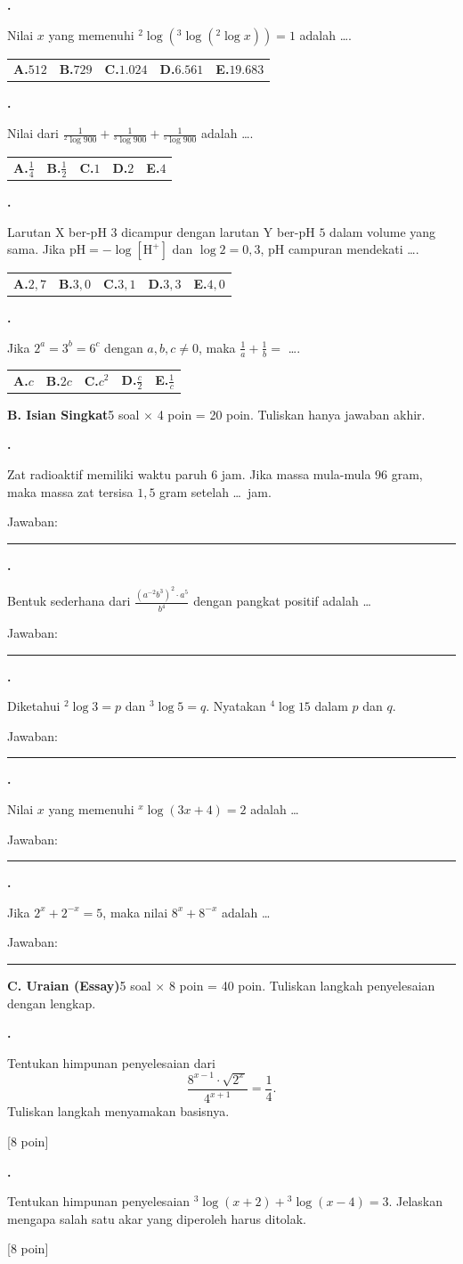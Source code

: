 \documentclass[a4paper,11pt]{article}
\newcommand{\dis}{\displaystyle}
\newcommand{\alog}[2]{{}^{#1}\!\log #2}
\newcounter{no}
\newcommand{\bagian}[2]{\par\Needspace{6\baselineskip}\vspace{1.0em}\noindent
  \begin{tcolorbox}[colback=navy,colframe=navy,coltext=white,boxrule=0pt,arc=2pt,left=6pt,right=6pt,top=3pt,bottom=3pt]
  \textbf{#1}\hfill{\small #2}\end{tcolorbox}\setcounter{no}{0}\par\vspace{-0.3em}}
\newcommand{\soal}[2]{\par\vspace{0.75em}\stepcounter{no}\noindent
  \begin{minipage}[t]{1.8em}\textbf{\theno.}\end{minipage}%
  \begin{minipage}[t]{\dimexpr\linewidth-1.8em\relax}#1\par\vspace{0.35em}#2\end{minipage}\par}
\newcommand{\poin}[1]{\hfill{\small\color{navy}[#1 poin]}}
\begin{document}
\soal{Nilai $x$ yang memenuhi $\alog{2}{\left(\alog{3}{\left(\alog{2}{x}\right)}\right)}=1$ adalah \dots.}{\begin{tabularx}{\linewidth}{@{}*{5}{X}@{}}\textbf{A.}\;$512$ & \textbf{B.}\;$729$ & \textbf{C.}\;$1.024$ & \textbf{D.}\;$6.561$ & \textbf{E.}\;$19.683$\end{tabularx}}
\soal{Nilai dari $\dis\frac{1}{\alog{2}{900}}+\dis\frac{1}{\alog{3}{900}}+\dis\frac{1}{\alog{5}{900}}$ adalah \dots.}{\begin{tabularx}{\linewidth}{@{}*{5}{X}@{}}\textbf{A.}\;$\dis\frac14$ & \textbf{B.}\;$\dis\frac12$ & \textbf{C.}\;$1$ & \textbf{D.}\;$2$ & \textbf{E.}\;$4$\end{tabularx}}
\soal{Larutan X ber-pH $3$ dicampur dengan larutan Y ber-pH $5$ dalam volume yang sama. Jika \mbox{$\mathrm{pH}=-\log[\mathrm{H}^{+}]$} dan $\log 2=0{,}3$, pH campuran mendekati \dots.}{\begin{tabularx}{\linewidth}{@{}*{5}{X}@{}}\textbf{A.}\;$2{,}7$ & \textbf{B.}\;$3{,}0$ & \textbf{C.}\;$3{,}1$ & \textbf{D.}\;$3{,}3$ & \textbf{E.}\;$4{,}0$\end{tabularx}}
\soal{Jika $2^{a}=3^{b}=6^{c}$ dengan $a,b,c\neq0$, maka $\dis\frac{1}{a}+\dis\frac{1}{b}=$ \dots.}{\begin{tabularx}{\linewidth}{@{}*{5}{X}@{}}\textbf{A.}\;$c$ & \textbf{B.}\;$2c$ & \textbf{C.}\;$c^{2}$ & \textbf{D.}\;$\dis\frac{c}{2}$ & \textbf{E.}\;$\dis\frac{1}{c}$\end{tabularx}}
\bagian{B. Isian Singkat}{5 soal $\times$ 4 poin = 20 poin. Tuliskan hanya jawaban akhir.}
\soal{Zat radioaktif memiliki waktu paruh $6$ jam. Jika massa mula-mula $96$ gram, maka massa zat tersisa $1{,}5$ gram setelah \dots\ jam.}{\hfill Jawaban: \rule{4.5cm}{0.4pt}}
\soal{Bentuk sederhana dari $\dis\frac{\left(a^{-2}b^{3}\right)^{2}\cdot a^{5}}{b^{4}}$ dengan pangkat positif adalah \dots}{\hfill Jawaban: \rule{4.5cm}{0.4pt}}
\soal{Diketahui $\alog{2}{3}=p$ dan $\alog{3}{5}=q$. Nyatakan $\alog{4}{15}$ dalam $p$ dan $q$.}{\hfill Jawaban: \rule{4.5cm}{0.4pt}}
\soal{Nilai $x$ yang memenuhi $\alog{x}{(3x+4)}=2$ adalah \dots}{\hfill Jawaban: \rule{4.5cm}{0.4pt}}
\soal{Jika $2^{x}+2^{-x}=5$, maka nilai $8^{x}+8^{-x}$ adalah \dots}{\hfill Jawaban: \rule{4.5cm}{0.4pt}}
\bagian{C. Uraian (Essay)}{5 soal $\times$ 8 poin = 40 poin. Tuliskan langkah penyelesaian dengan lengkap.}
\soal{Tentukan himpunan penyelesaian dari \[ \dis\frac{8^{x-1}\cdot\sqrt{2^{x}}}{4^{x+1}}=\dis\frac{1}{4}. \] Tuliskan langkah menyamakan basisnya.}{\poin{8}}
\soal{Tentukan himpunan penyelesaian $\alog{3}{(x+2)}+\alog{3}{(x-4)}=3$. Jelaskan mengapa salah satu akar yang diperoleh harus ditolak.}{\poin{8}}
\end{document}
